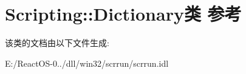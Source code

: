 \hypertarget{class_scripting_1_1_dictionary}{}\section{Scripting\+:\+:Dictionary类 参考}
\label{class_scripting_1_1_dictionary}


该类的文档由以下文件生成\+:\begin{DoxyCompactItemize}
\item 
E\+:/\+React\+O\+S-\/0../dll/win32/scrrun/scrrun.\+idl\end{DoxyCompactItemize}
